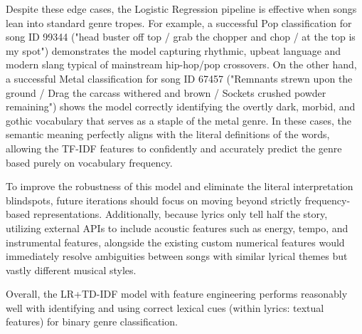 Despite these edge cases, the Logistic Regression pipeline is effective when songs lean into standard genre tropes. For example, a successful Pop classification for song ID 99344 ("head buster off top / grab the chopper and chop / at the top is my spot") demonstrates the model capturing rhythmic, upbeat language and modern slang typical of mainstream hip-hop/pop crossovers. On the other hand, a successful Metal classification for song ID 67457 ("Remnants strewn upon the ground / Drag the carcass withered and brown / Sockets crushed powder remaining") shows the model correctly identifying the overtly dark, morbid, and gothic vocabulary that serves as a staple of the metal genre. In these cases, the semantic meaning perfectly aligns with the literal definitions of the words, allowing the TF-IDF features to confidently and accurately predict the genre based purely on vocabulary frequency.

To improve the robustness of this model and eliminate the literal interpretation blindspots, future iterations should focus on moving beyond strictly frequency-based representations. Additionally, because lyrics only tell half the story, utilizing external APIs to include acoustic features such as energy, tempo, and instrumental features, alongside the existing custom numerical features would immediately resolve ambiguities between songs with similar lyrical themes but vastly different musical styles. 


Overall, the LR+TD-IDF model with feature engineering performs reasonably well with identifying and using correct lexical cues (within lyrics: textual features) for binary genre classification. 